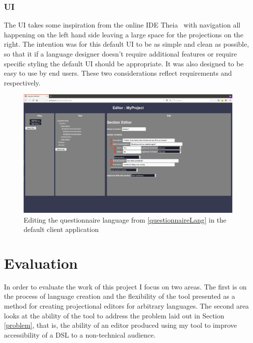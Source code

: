\documentclass{article}
\begin{document}
\subsubsection{UI}
The UI takes some inspiration from the online IDE Theia~\cite{theia} with navigation all happening on the left hand side leaving a large space for the projections on the right. The intention was for this default UI to be as simple and clean as possible, so that it if a language designer doesn't require additional features or require specific styling the default UI should be appropriate. It was also designed to be easy to use by end users. These two considerations reflect requirements \RSetup and \RIntuitive respectively.
\begin{figure}[h!]
  \centering
  \includegraphics[width=\linewidth]{./Screenshots/WebUIScreenshot.png}
  \caption{Editing the questionnaire language from \ref{questionnaireLang} in the default client application}
  \label{fig:webUI}
\end{figure}
%
%
\section{Evaluation}\label{evaluation}
In order to evaluate the work of this project I focus on two areas. The first is on the process of language creation and the flexibility of the tool presented as a method for creating projectional editors for arbitrary languages. The second area looks at the ability of the tool to address the problem laid out in Section \ref{problem}, that is, the ability of an editor produced using my tool to improve accessibility of a DSL to a non-technical audience.
\end{document}

